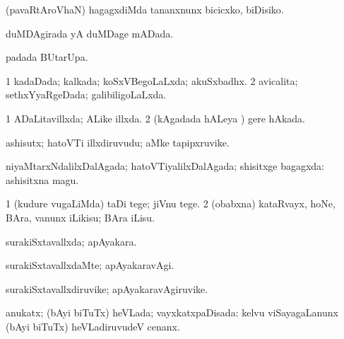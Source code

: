 {{\noindent 
\gl{\akirx}
\expl{}
\bmng
(pavaRtAroVhaN) hagagxdiMda tananxnunx bicicxko, biDisiko. 
\emng
\eentry

\bentry
{} 
\gl{\gu}
\expl{}
\bmng
duMDAgirada yA duMDage mADada. 
\emng
\eentry

\bentry
{} 
\gl{\kirx}
\expl{}
\bmng
{} padada BUtarUpa. 
\emng
\eentry

\bentry
{} 
\gl{\gu}
\expl{}
\bmng
{} 
\emng
\eentry

\bentry
{} 
\gl{\gu}
\expl{}
\bmng
\bnum
\num{1} kadaDada; kalkada; koSxVBegoLaLxda; akuSxbadhx. 
\num{2} avicalita; sethxYyaRgeDada; galibiligoLaLxda. 
\enum
\emng
\eentry

\bentry
{} 
\gl{\gu}
\expl{}
\bmng
\bnum
\num{1} ADaLitavillxda; ALike illxda. 
\num{2} (kAgadada hALeya \vi) gere hAkada. 
\enum
\emng
\eentry

\bentry
{} 
\gl{\nA}
\expl{}
\bmng
ashisutx; hatoVTi illxdiruvudu; aMke tapipxruvike. 
\emng
\eentry

\bentry
{} 
\gl{\gu}
\bmng
niyaMtarxNdalilxDalAgada; hatoVTiyalilxDalAgada; shisitxge bagagxda:  ashisitxna magu. 
\emng
\eentry

\bentry
{} 
\gl{\saMkiSx}
\expl{}
\bmng
{} 
\emng
\eentry

\bentry
{} 
\gl{\sakirx}
\expl{}
\bmng
\bnum
\num{1} (kudure \mo vugaLiMda) taDi tege; jiVnu tege. 
\num{2} (obabxna) kataRvayx, hoNe, BAra, \mo vanunx iLikisu; BAra iLisu. 
\enum
\emng
\eentry

\bentry
{} 
\gl{\gu}
\expl{}
\bmng
surakiSxtavallxda; apAyakara. 
\emng
\eentry

\bentry
{} 
\gl{\kirxvi}
\expl{}
\bmng
surakiSxtavallxdaMte; apAyakaravAgi. 
\emng
\eentry

\bentry
{} 
\gl{\nA}
\expl{}
\bmng
surakiSxtavallxdiruvike; apAyakaravAgiruvike. 
\emng
\eentry

\bentry
{} 
\gl{\gu}
\expl{}
\bmng
anukatx; (bAyi biTuTx) heVLada; vayxkatxpaDisada:  kelvu viSayagaLanunx (bAyi biTuTx) heVLadiruvudeV cenanx. 
\emng
\eentry

}}
